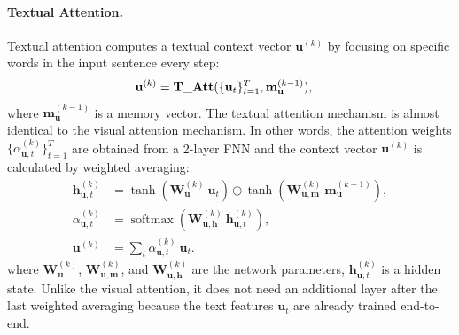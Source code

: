 \documentclass[10pt,twocolumn,letterpaper]{article}
\begin{document}
\paragraph{Textual Attention.}
Textual attention computes a textual context vector $\mathbf{u}^{(k)}$ by focusing on specific words in the input sentence every step:
\begin{align}
\mathbf{u}^{(k)} &= \operatorname{\bf{T\_Att}}(\{\mathbf{u}_t\}_{t=1}^T, \mathbf{m}_\mathbf{u}^{(k-1)}),
\label{eq:t_att}
\end{align}
where $\mathbf{m}_\mathbf{u}^{(k-1)}$ is a memory vector.
The textual attention mechanism is almost identical to the visual attention mechanism.
In other words, the attention weights $\{\alpha_{\mathbf{u},t}^{(k)}\}_{t=1}^T$ are obtained from a 2-layer FNN and the context vector $\mathbf{u}^{(k)}$ is calculated by weighted averaging:
\begin{align}
\mathbf{h}_{\mathbf{u},t}^{(k)} &= \tanh \left( \mathbf{W}_\mathbf{u}^{(k)}~\mathbf{u}_t \right) 
				   	     \odot \tanh \left( \mathbf{W}_{\mathbf{u},\mathbf{m}}^{(k)}~\mathbf{m}_\mathbf{u}^{(k-1)} \right), \\
\alpha_{\mathbf{u},t}^{(k)} &= \operatorname{softmax} \left( \mathbf{W}_{\mathbf{u},\mathbf{h}}^{(k)}~\mathbf{h}_{\mathbf{u},t}^{(k)} \right), \\
\mathbf{u}^{(k)} &= \sum_{t}{\alpha_{\mathbf{u},t}^{(k)}~\mathbf{u}_t}.
\label{eq:t_context}
\end{align}
where $\mathbf{W}_\mathbf{u}^{(k)}$, $\mathbf{W}_{\mathbf{u},\mathbf{m}}^{(k)}$, and $\mathbf{W}_{\mathbf{u},\mathbf{h}}^{(k)}$ are the network parameters, $\mathbf{h}_{\mathbf{u},t}^{(k)}$ is a hidden state.
Unlike the visual attention, it does not need an additional layer after the last weighted averaging because the text features $\mathbf{u}_t$ are already trained end-to-end.
\end{document}
